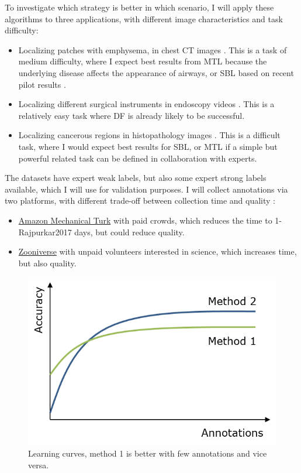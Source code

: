 \documentclass[serif, twocolumn, numeric, rga]{jote-article}
\begin{document}
To investigate which strategy is better in which scenario, I will apply these algorithms to three applications, with different image characteristics and task difficulty: 
\begin{itemize}
\item   Localizing patches with emphysema, in chest CT images \cite{Depeursinge2012, Pedersen2009}.
  This is a task of medium difficulty, where I expect best results from   MTL because the underlying disease affects the appearance of airways,   or SBL based on recent pilot results \cite{Orting2017}.
\item   Localizing different surgical instruments in endoscopy videos   \cite{Ross2017}. This is a relatively easy task where DF is already likely to   be successful.
\item   Localizing cancerous regions in histopathology images \cite{Veta2015}. This   is a difficult task, where I would expect best results for SBL, or MTL   if a simple but powerful related task can be defined in collaboration   with experts.
\end{itemize}

The datasets have expert weak labels, but also some expert strong labels available, which I will use for validation purposes. I will collect annotations via two platforms, with different trade-off between collection time and quality \cite{Mao2013}: 
\begin{itemize}
\item   \href{https://www.mturk.com/mturk/welcome}{Amazon Mechanical Turk}
  with paid crowds, which reduces the time to 1-Rajpurkar2017 days, but could reduce   quality.
\item   \href{https://www.zooniverse.org/}{Zooniverse} with unpaid volunteers   interested in science, which increases time, but also quality.
\end{itemize}


\begin{figure}
\vskip-12pt
\centering \includegraphics[width=0.6\columnwidth]{articles/RGAs/Veronika/graph.png}
\caption{Learning curves, method 1 is better with few annotations and vice versa.}
\label{fig:graph}
\end{figure}
\end{document}
